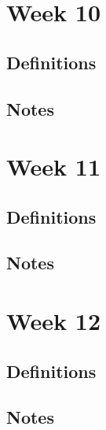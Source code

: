 \documentclass[12pt]{article}
\begin{document}

\section{Week 10}

\subsection{Definitions}
\subsection{Notes}





\section{Week 11}

\subsection{Definitions}
\subsection{Notes}





\section{Week 12}

\subsection{Definitions}
\subsection{Notes}
\end{document}
